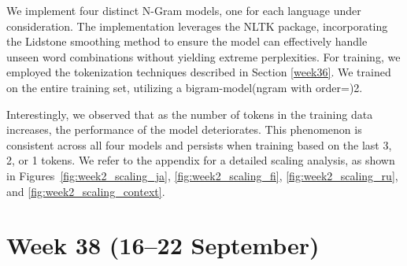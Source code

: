 \documentclass[11pt]{article}
\begin{document}
We implement four distinct N-Gram models, one for each language under consideration. 
The implementation leverages the NLTK package, incorporating the Lidstone smoothing method to ensure the model can effectively handle unseen word combinations without yielding extreme perplexities.
For training, we employed the tokenization techniques described in Section \ref{week36}. We trained on the entire training set, utilizing a bigram-model(ngram with order=)2.

\begin{table}[ht]
    \centering
    \caption{Language Model Performance}
    \label{tab:language_model_performance}
\end{table}

Interestingly, we observed that as the number of tokens in the training data increases, the performance of the model deteriorates. 
This phenomenon is consistent across all four models and persists when training based on the last 3, 2, or 1 tokens. 
We refer to the appendix for a detailed scaling analysis, as shown in Figures~\ref{fig:week2_scaling_ja}, \ref{fig:week2_scaling_fi}, \ref{fig:week2_scaling_ru}, and \ref{fig:week2_scaling_context}.  

\section{Week 38 (16--22 September)}
\label{sec:week38}
\end{document}
